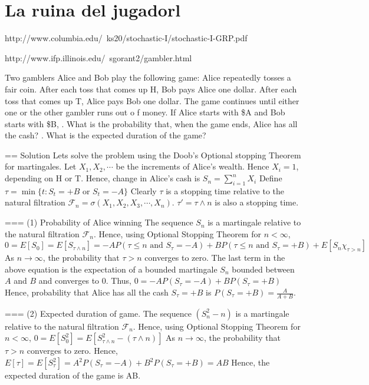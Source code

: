 \chapter{La ruina del jugadorl}\label{chap:ruina}

http://www.columbia.edu/~ks20/stochastic-I/stochastic-I-GRP.pdf


http://www.ifp.illinois.edu/~sgorant2/gambler.html


Two gamblers Alice and Bob play the following game: Alice repeatedly tosses a fair coin. 
After each toss that comes up H, Bob pays Alice one dollar. After each toss that comes up T, 
Alice pays Bob one dollar. The game continues until either one or the other gambler runs out o
f money. If Alice starts with \$A and Bob starts with \$B,
. What is the probability that, when the game ends, Alice has all the cash?
. What is the expected duration of the game?
 
== Solution
Lets solve the problem using the Doob's Optional stopping Theorem for martingales.
Let $X_1,X_2,\cdots$ be the increments of Alice's wealth. Hence $X_i= 1$, depending on H or T. 
Hence, change in Alice's cash is
\( 
S_n = \sum_{i=1}^n X_i 
\)
Define  
\(
\tau = \min\{t: S_t = +B \mbox{ or } S_t = -A \}
\)
Clearly $\tau$ is a stopping time relative to the natural filtration
$\mathcal{F}_n = \sigma(X_1,X_2,X_3,\cdots,X_n)$. 
$\tau' = \tau \wedge n$ is also a stopping time.

=== (1) Probability of Alice winning
The sequence $S_n$ is a martingale relative to the natural filtration $\mathcal{F}_n$. 
Hence, using Optional Stopping Theorem for $n < \infty$,
\( 
 0 = {E}[S_0] = {E}[S_{\tau \wedge n}] = -A P(\tau \leq n \mbox{ and } S_{\tau} = -A) + B P(\tau \leq n \mbox{ and } S_{\tau} = +B) + E[S_n \chi_{\tau > n}]
 \)                                               
 As $n \to \infty$, the probability that  $\tau > n$ converges to zero. 
 The last term in the above equation is the expectation of a bounded martingale $S_n$
 bounded between $A$ and $B$ and converges to 0. Thus,
 \(
  0 = - A P(S_{\tau} = -A) + B P(S_{\tau} = +B) 
 \)
 Hence, probability that Alice has all the cash $S_{\tau} = +B$ is
 \(
 P(S_{\tau} = +B) = \frac{A}{A+B}.
 \)
 
=== (2) Expected duration of game.
The sequence $(S_n^2-n)$ is a martingale relative to the natural filtration $\mathcal{F}_n$.
Hence, using Optional Stopping Theorem for $n < \infty$,
\( 
 0 = {E}[S^2_0] = {E}[S_{\tau \wedge n}^2 - (\tau \wedge n)]
 \)                                                                                                          
 As $n \to \infty$, the probability that  $\tau > n$ converges to zero. 
Hence,
\(
E[\tau] = E[S_{\tau}^2] = A^2  P(S_{\tau} = -A) + B^2  P(S_{\tau} = +B) = AB 
\)                               
Hence, the expected duration of the game is AB.